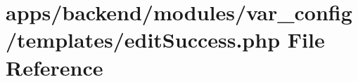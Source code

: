 \hypertarget{backend_2modules_2var__config_2templates_2edit_success_8php}{\section{apps/backend/modules/var\-\_\-config/templates/edit\-Success.php File Reference}
\label{backend_2modules_2var__config_2templates_2edit_success_8php}
}
